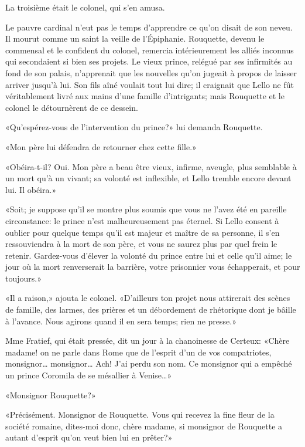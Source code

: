 La troisième était le colonel, qui s'en amusa.

Le pauvre cardinal n'eut pas le temps d'apprendre ce qu'on disait de son
neveu. Il mourut comme un saint la veille de l'Épiphanie. Rouquette,
devenu le commensal et le confident du colonel, remercia intérieurement
les alliés inconnus qui secondaient si bien ses projets. Le vieux
prince, relégué par ses infirmités au fond de son palais, n'apprenait
que les nouvelles qu'on jugeait à propos de laisser arriver jusqu'à lui.
Son fils aîné voulait tout lui dire; il craignait que Lello ne fût
véritablement livré aux mains d'une famille d'intrigants; mais Rouquette
et le colonel le détournèrent de ce dessein.

«Qu'espérez-vous de l'intervention du prince?» lui demanda Rouquette.

«Mon père lui défendra de retourner chez cette fille.»

«Obéira-t-il? Oui. Mon père a beau être vieux, infirme, aveugle, plus
semblable à un mort qu'à un vivant; sa volonté est inflexible, et Lello
tremble encore devant lui. Il obéira.»

«Soit; je suppose qu'il se montre plus soumis que vous ne l'avez été en
pareille circonstance: le prince n'est malheureusement pas éternel. Si
Lello consent à oublier pour quelque temps qu'il est majeur et maître de
sa personne, il s'en ressouviendra à la mort de son père, et vous ne
saurez plus par quel frein le retenir. Gardez-vous d'élever la volonté
du prince entre lui et celle qu'il aime; le jour où la mort renverserait
la barrière, votre prisonnier vous échapperait, et pour toujours.»

«Il a raison,» ajouta le colonel. «D'ailleurs ton projet nous attirerait
des scènes de famille, des larmes, des prières et un débordement de
rhétorique dont je bâille à l'avance. Nous agirons quand il en sera
temps; rien ne presse.»

Mme Fratief, qui était pressée, dit un jour à la chanoinesse de Certeux:
«Chère madame! on ne parle dans Rome que de l'esprit d'un de vos
compatriotes, monsignor\ldots{} monsignor\ldots{} Ach! J'ai perdu son
nom. Ce monsignor qui a empêché un prince Coromila de se mésallier à
Venise\ldots»

«Monsignor Rouquette?»

«Précisément. Monsignor de Rouquette. Vous qui recevez la fine fleur de
la société romaine, dites-moi donc, chère madame, si monsignor de
Rouquette a autant d'esprit qu'on veut bien lui en prêter?»

